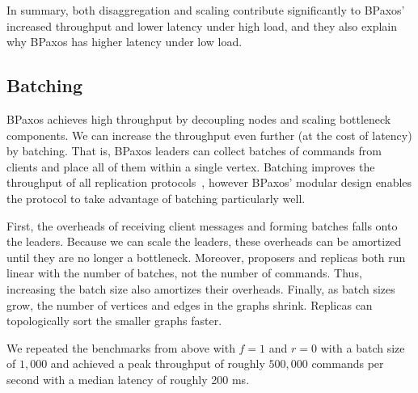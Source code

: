 In summary, both disaggregation and scaling contribute significantly to BPaxos'
increased throughput and lower latency under high load, and they also explain
why BPaxos has higher latency under low load.

%
%
\subsection{Batching}
BPaxos achieves high throughput by decoupling nodes and scaling bottleneck
components. We can increase the throughput even further (at the cost of
latency) by batching. That is, BPaxos leaders can collect batches of commands
from clients and place all of them within a single vertex. Batching improves
the throughput of all replication protocols~\cite{santos2012tuning,
santos2013optimizing, moraru2013proof}, however BPaxos' modular design enables
the protocol to take advantage of batching particularly well.

First, the overheads of receiving client messages and forming batches falls
onto the leaders. Because we can scale the leaders, these overheads can be
amortized until they are no longer a bottleneck. Moreover, proposers and
replicas both run linear with the number of batches, not the number of
commands. Thus, increasing the batch size also amortizes their overheads.
Finally, as batch sizes grow, the number of vertices and edges in the graphs
shrink. Replicas can topologically sort the smaller graphs faster.

We repeated the benchmarks from above with $f=1$ and $r=0$ with a batch size of
$1,000$ and achieved a peak throughput of roughly $500,000$ commands per second
with a median latency of roughly 200 ms.
